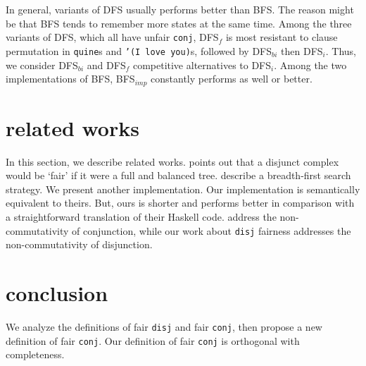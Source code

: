 \documentclass[acmlarge, review=true]{acmart}
\newcommand{\conj}{\texttt{conj}}
\newcommand{\disj}{\texttt{disj}}
\newcommand{\appendo}{\texttt{append$^o$}}
\newcommand{\reverso}{\texttt{revers$^o$}}
\newcommand{\DFSi }[0]{DFS$_{i}$}
\newcommand{\DFSf }[0]{DFS$_{f}$}
\newcommand{\DFSbi}[0]{DFS$_{bi}$}
\newcommand{\BFS}[0]{BFS}
\newcommand{\BFSimp}[0]{BFS$_{imp}$}
\begin{document}

In general, variants of DFS usually performs better than BFS. The reason might 
be that \BFS{} tends to remember more states at the same time. Among the three 
variants of DFS, which all have unfair \conj{}, \DFSf{} is most resistant to 
clause permutation in \texttt{quine}s and \texttt{'(I love you)}s, followed by 
\DFSbi{} then \DFSi{}. Thus, we consider \DFSbi{} and \DFSf{} competitive 
alternatives to \DFSi{}. Among the two implementations of \BFS, \BFSimp{} 
constantly performs as well or better.

\section{related works}

In this section, we describe related works. 
\citet{yang2010adventures} points 
out that a disjunct complex would be `fair' if it were a full and balanced tree.
\citet{seres1999algebra} describe a breadth-first search 
strategy. We present another implementation. Our implementation is semantically 
equivalent to theirs. But, ours is shorter and performs better in comparison 
with a straightforward translation of their Haskell code.
\citet{rozplokhas2018improving} address the non-commutativity of conjunction, 
while our work about \disj{} fairness addresses the non-commutativity of 
disjunction.

\section{conclusion}

We analyze the definitions of fair \disj{} and fair \conj{}, then propose a 
new definition of fair \conj{}. Our definition of fair \conj{} is orthogonal 
with completeness.
\end{document}
